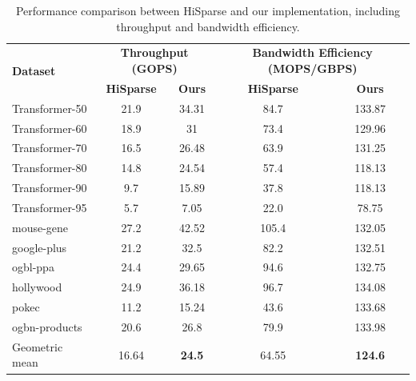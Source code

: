 \documentclass[manuscript,screen,review]{acmart}
\begin{document}
\begin{table}[h!]
	\centering
	\begin{tabular}{|l|c|c|c|c|}
		\hline
		\multirow{2}{*}{\textbf{Dataset}} & \multicolumn{2}{c|}{\textbf{Throughput (GOPS)}} & \multicolumn{2}{c|}{\textbf{Bandwidth Efficiency (MOPS/GBPS)}} \\
		\cline{2-5}
		& \textbf{HiSparse} & \textbf{Ours} & \textbf{HiSparse} & \textbf{Ours} \\
		\hline
		Transformer-50 & 21.9 & 34.31 & 84.7 & 133.87 \\
		Transformer-60 & 18.9 & 31 & 73.4 & 129.96 \\		
		Transformer-70 & 16.5 & 26.48 & 63.9 & 131.25 \\		
		Transformer-80 & 14.8 & 24.54 & 57.4 & 118.13 \\
		Transformer-90 & 9.7 & 15.89 & 37.8 & 118.13 \\		
		Transformer-95 & 5.7 & 7.05 & 22.0 & 78.75 \\
		mouse-gene & 27.2 & 42.52 & 105.4 & 132.05 \\
		google-plus & 21.2 & 32.5 & 82.2 & 132.51 \\
		ogbl-ppa & 24.4 & 29.65 & 94.6 & 132.75 \\
		hollywood & 24.9 & 36.18 & 96.7 & 134.08 \\
		pokec & 11.2 & 15.24 & 43.6 & 133.68 \\
		ogbn-products & 20.6 & 26.8 & 79.9 & 133.98 \\
		\hline
		Geometric mean & 16.64 & \textbf{24.5} & 64.55 & \textbf{124.6} \\
		\hline
	\end{tabular}
	\caption{Performance comparison between HiSparse and our implementation, including throughput and bandwidth efficiency.}
	\label{hisparse}
\end{table}
\end{document}
